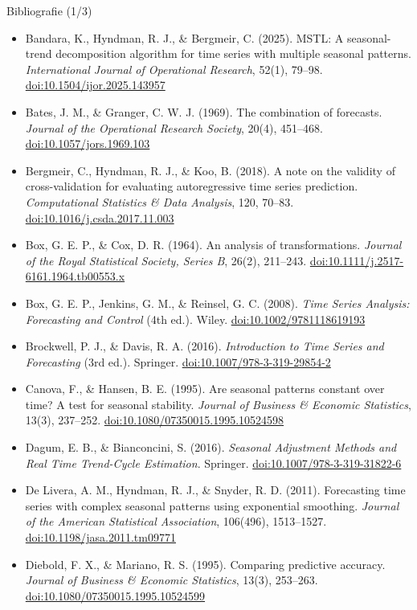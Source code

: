 \begin{frame}{Bibliografie (1/3)}
\itemsize{\scriptsize}
\begin{itemize}
    \item Bandara, K., Hyndman, R. J., \& Bergmeir, C. (2025). MSTL: A seasonal-trend decomposition algorithm for time series with multiple seasonal patterns. \textit{International Journal of Operational Research}, 52(1), 79--98. \href{https://doi.org/10.1504/ijor.2025.143957}{doi:10.1504/ijor.2025.143957}
    \item Bates, J. M., \& Granger, C. W. J. (1969). The combination of forecasts. \textit{Journal of the Operational Research Society}, 20(4), 451--468. \href{https://doi.org/10.1057/jors.1969.103}{doi:10.1057/jors.1969.103}
    \item Bergmeir, C., Hyndman, R. J., \& Koo, B. (2018). A note on the validity of cross-validation for evaluating autoregressive time series prediction. \textit{Computational Statistics \& Data Analysis}, 120, 70--83. \href{https://doi.org/10.1016/j.csda.2017.11.003}{doi:10.1016/j.csda.2017.11.003}
    \item Box, G. E. P., \& Cox, D. R. (1964). An analysis of transformations. \textit{Journal of the Royal Statistical Society, Series B}, 26(2), 211--243. \href{https://doi.org/10.1111/j.2517-6161.1964.tb00553.x}{doi:10.1111/j.2517-6161.1964.tb00553.x}
    \item Box, G. E. P., Jenkins, G. M., \& Reinsel, G. C. (2008). \textit{Time Series Analysis: Forecasting and Control} (4th ed.). Wiley. \href{https://doi.org/10.1002/9781118619193}{doi:10.1002/9781118619193}
    \item Brockwell, P. J., \& Davis, R. A. (2016). \textit{Introduction to Time Series and Forecasting} (3rd ed.). Springer. \href{https://doi.org/10.1007/978-3-319-29854-2}{doi:10.1007/978-3-319-29854-2}
    \item Canova, F., \& Hansen, B. E. (1995). Are seasonal patterns constant over time? A test for seasonal stability. \textit{Journal of Business \& Economic Statistics}, 13(3), 237--252. \href{https://doi.org/10.1080/07350015.1995.10524598}{doi:10.1080/07350015.1995.10524598}
    \item Dagum, E. B., \& Bianconcini, S. (2016). \textit{Seasonal Adjustment Methods and Real Time Trend-Cycle Estimation}. Springer. \href{https://doi.org/10.1007/978-3-319-31822-6}{doi:10.1007/978-3-319-31822-6}
    \item De Livera, A. M., Hyndman, R. J., \& Snyder, R. D. (2011). Forecasting time series with complex seasonal patterns using exponential smoothing. \textit{Journal of the American Statistical Association}, 106(496), 1513--1527. \href{https://doi.org/10.1198/jasa.2011.tm09771}{doi:10.1198/jasa.2011.tm09771}
    \item Diebold, F. X., \& Mariano, R. S. (1995). Comparing predictive accuracy. \textit{Journal of Business \& Economic Statistics}, 13(3), 253--263. \href{https://doi.org/10.1080/07350015.1995.10524599}{doi:10.1080/07350015.1995.10524599}
\end{itemize}
\end{frame}

